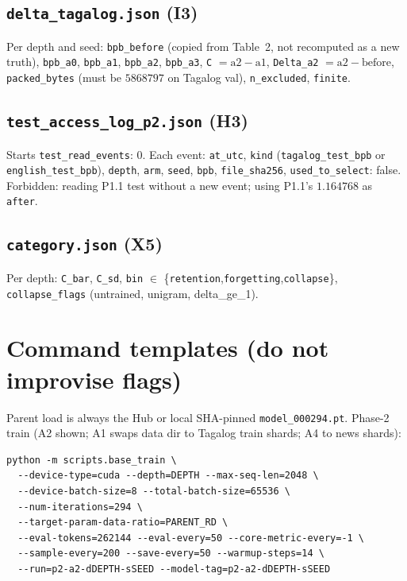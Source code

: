 \documentclass[11pt,a4paper]{article}
\begin{document}
\subsection{\texttt{delta\_tagalog.json} (I3)}
Per depth and seed: \texttt{bpb\_before} (copied from Table~2, not recomputed as a new truth), \texttt{bpb\_a0}, \texttt{bpb\_a1}, \texttt{bpb\_a2}, \texttt{bpb\_a3}, \texttt{C} $=\mathrm{a2}-\mathrm{a1}$, \texttt{Delta\_a2} $=\mathrm{a2}-\mathrm{before}$, \texttt{packed\_bytes} (must be $5868797$ on Tagalog val), \texttt{n\_excluded}, \texttt{finite}.

\subsection{\texttt{test\_access\_log\_p2.json} (H3)}
Starts \texttt{test\_read\_events}: $0$. Each event: \texttt{at\_utc}, \texttt{kind} (\texttt{tagalog\_test\_bpb} or \texttt{english\_test\_bpb}), \texttt{depth}, \texttt{arm}, \texttt{seed}, \texttt{bpb}, \texttt{file\_sha256}, \texttt{used\_to\_select}: false. Forbidden: reading P1.1 test without a new event; using P1.1's $1.164768$ as \texttt{after}.

\subsection{\texttt{category.json} (X5)}
Per depth: \texttt{C\_bar}, \texttt{C\_sd}, \texttt{bin} $\in$ \{\texttt{retention},\texttt{forgetting},\texttt{collapse}\}, \texttt{collapse\_flags} (untrained, unigram, delta\_ge\_1).

\section{Command templates (do not improvise flags)}
\label{app:cmd}

Parent load is always the Hub or local SHA-pinned \texttt{model\_000294.pt}. Phase-2 train (A2 shown; A1 swaps data dir to Tagalog train shards; A4 to news shards):

\begin{verbatim}
python -m scripts.base_train \
  --device-type=cuda --depth=DEPTH --max-seq-len=2048 \
  --device-batch-size=8 --total-batch-size=65536 \
  --num-iterations=294 \
  --target-param-data-ratio=PARENT_RD \
  --eval-tokens=262144 --eval-every=50 --core-metric-every=-1 \
  --sample-every=200 --save-every=50 --warmup-steps=14 \
  --run=p2-a2-dDEPTH-sSEED --model-tag=p2-a2-dDEPTH-sSEED
\end{verbatim}
\end{document}

